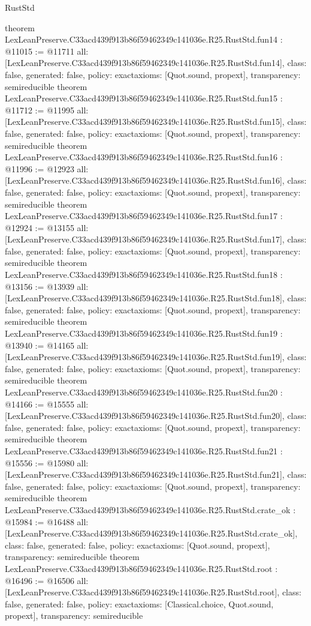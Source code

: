 \begin{lexlean}{RustStd}
\begin{coremodule}
{}
theorem LexLeanPreserve.C33acd439f913b86f59462349c141036e.R25.RustStd.fun14 : @11015 := @11711 {
  all: [LexLeanPreserve.C33acd439f913b86f59462349c141036e.R25.RustStd.fun14],
  class: false,
  generated: false,
  policy: exact{axioms: [Quot.sound, propext]},
  transparency: semireducible
}
theorem LexLeanPreserve.C33acd439f913b86f59462349c141036e.R25.RustStd.fun15 : @11712 := @11995 {
  all: [LexLeanPreserve.C33acd439f913b86f59462349c141036e.R25.RustStd.fun15],
  class: false,
  generated: false,
  policy: exact{axioms: [Quot.sound, propext]},
  transparency: semireducible
}
theorem LexLeanPreserve.C33acd439f913b86f59462349c141036e.R25.RustStd.fun16 : @11996 := @12923 {
  all: [LexLeanPreserve.C33acd439f913b86f59462349c141036e.R25.RustStd.fun16],
  class: false,
  generated: false,
  policy: exact{axioms: [Quot.sound, propext]},
  transparency: semireducible
}
theorem LexLeanPreserve.C33acd439f913b86f59462349c141036e.R25.RustStd.fun17 : @12924 := @13155 {
  all: [LexLeanPreserve.C33acd439f913b86f59462349c141036e.R25.RustStd.fun17],
  class: false,
  generated: false,
  policy: exact{axioms: [Quot.sound, propext]},
  transparency: semireducible
}
theorem LexLeanPreserve.C33acd439f913b86f59462349c141036e.R25.RustStd.fun18 : @13156 := @13939 {
  all: [LexLeanPreserve.C33acd439f913b86f59462349c141036e.R25.RustStd.fun18],
  class: false,
  generated: false,
  policy: exact{axioms: [Quot.sound, propext]},
  transparency: semireducible
}
theorem LexLeanPreserve.C33acd439f913b86f59462349c141036e.R25.RustStd.fun19 : @13940 := @14165 {
  all: [LexLeanPreserve.C33acd439f913b86f59462349c141036e.R25.RustStd.fun19],
  class: false,
  generated: false,
  policy: exact{axioms: [Quot.sound, propext]},
  transparency: semireducible
}
theorem LexLeanPreserve.C33acd439f913b86f59462349c141036e.R25.RustStd.fun20 : @14166 := @15555 {
  all: [LexLeanPreserve.C33acd439f913b86f59462349c141036e.R25.RustStd.fun20],
  class: false,
  generated: false,
  policy: exact{axioms: [Quot.sound, propext]},
  transparency: semireducible
}
theorem LexLeanPreserve.C33acd439f913b86f59462349c141036e.R25.RustStd.fun21 : @15556 := @15980 {
  all: [LexLeanPreserve.C33acd439f913b86f59462349c141036e.R25.RustStd.fun21],
  class: false,
  generated: false,
  policy: exact{axioms: [Quot.sound, propext]},
  transparency: semireducible
}
theorem LexLeanPreserve.C33acd439f913b86f59462349c141036e.R25.RustStd.crate_ok : @15984 := @16488 {
  all: [LexLeanPreserve.C33acd439f913b86f59462349c141036e.R25.RustStd.crate_ok],
  class: false,
  generated: false,
  policy: exact{axioms: [Quot.sound, propext]},
  transparency: semireducible
}
theorem LexLeanPreserve.C33acd439f913b86f59462349c141036e.R25.RustStd.root : @16496 := @16506 {
  all: [LexLeanPreserve.C33acd439f913b86f59462349c141036e.R25.RustStd.root],
  class: false,
  generated: false,
  policy: exact{axioms: [Classical.choice, Quot.sound, propext]},
  transparency: semireducible
}


\end{coremodule}
\end{lexlean}
